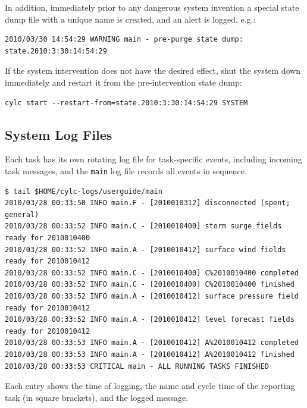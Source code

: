 \documentclass[11pt,a4paper]{article}
\begin{document}
In addition, immediately prior to any dangerous system invention a 
special state dump file with a unique name is created, and an alert is
logged, e.g.:

\begin{lstlisting}
2010/03/30 14:54:29 WARNING main - pre-purge state dump: state.2010:3:30:14:54:29
\end{lstlisting}

If the system intervention does not have the desired effect, shut the system 
down immediately and restart it from the pre-intervention state dump:

\begin{lstlisting}
cylc start --restart-from=state.2010:3:30:14:54:29 SYSTEM
\end{lstlisting}

\subsection{System Log Files}
\label{SystemLogFiles}

Each task has its own rotating log file for task-specific events,
including incoming task messages, and the \lstinline=main= log file
records all events in sequence.

\begin{lstlisting}
$ tail $HOME/cylc-logs/userguide/main
2010/03/28 00:33:50 INFO main.F - [2010010312] disconnected (spent; general)
2010/03/28 00:33:52 INFO main.C - [2010010400] storm surge fields ready for 2010010400
2010/03/28 00:33:52 INFO main.A - [2010010412] surface wind fields ready for 2010010412
2010/03/28 00:33:52 INFO main.C - [2010010400] C%2010010400 completed
2010/03/28 00:33:52 INFO main.C - [2010010400] C%2010010400 finished
2010/03/28 00:33:52 INFO main.A - [2010010412] surface pressure field ready for 2010010412
2010/03/28 00:33:52 INFO main.A - [2010010412] level forecast fields ready for 2010010412
2010/03/28 00:33:53 INFO main.A - [2010010412] A%2010010412 completed
2010/03/28 00:33:53 INFO main.A - [2010010412] A%2010010412 finished
2010/03/28 00:33:53 CRITICAL main - ALL RUNNING TASKS FINISHED
\end{lstlisting}


Each entry shows the time of logging, the name and cycle time of the
reporting task (in square brackets), and the logged message.
\end{document}
